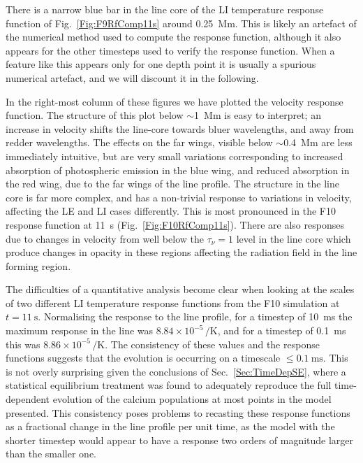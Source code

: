 There is a narrow blue bar in the line core of the LI temperature response function of Fig.~\ref{Fig:F9RfComp11s} around \SI{0.25}{\mega\metre}.
This is likely an artefact of the numerical method used to compute the response function, although it also appears for the other timesteps used to verify the response function.
When a feature like this appears only for one depth point it is usually a spurious numerical artefact, and we will discount it in the following.

In the right-most column of these figures we have plotted the velocity response function.
The structure of this plot below $\sim$\SI{1}{\mega\metre} is easy to interpret; an increase in velocity shifts the line-core towards bluer wavelengths, and away from redder wavelengths.
The effects on the far wings, visible below $\sim$\SI{0.4}{\mega\metre} are less immediately intuitive, but are very small variations corresponding to increased absorption of photospheric emission in the blue wing, and reduced absorption in the red wing, due to the far wings of the line profile.
The structure in the line core is far more complex, and has a non-trivial response to variations in velocity, affecting the LE and LI cases differently.
This is most pronounced in the F10 response function at \SI{11}{\second} (Fig.~\ref{Fig:F10RfComp11s}).
There are also responses due to changes in velocity from well below the $\tau_\nu=1$ level in the line core which produce changes in opacity in these regions affecting the radiation field in the line forming region.

The difficulties of a quantitative analysis become clear when looking at the scales of two different LI temperature response functions from the F10 simulation at $t=\SI{11}{\s}$.
Normalising the response to the line profile, for a timestep of \SI{10}{\milli\s} the maximum response in the \CaLine{} line was $8.84\times{}10^{-5}\,\si{\per\kelvin}$, and for
a timestep of \SI{0.1}{\milli\s} this was $8.86\times{}10^{-5}\,\si{\per\kelvin}$.
The consistency of these values and the response functions suggests that the evolution is occurring on a timescale $\leq \SI{0.1}{\milli\s}$.
This is not overly surprising given the conclusions of Sec.~\ref{Sec:TimeDepSE}, where a statistical equilibrium treatment was found to adequately reproduce the full time-dependent evolution of the calcium populations at most points in the model presented.
This consistency poses problems to recasting these response functions as a fractional change in the line profile per unit time, as the model with the shorter timestep would appear to have a response two orders of magnitude larger than the smaller one.


